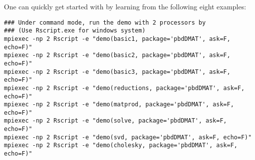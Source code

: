 One can quickly get started with  by learning from the following eight examples:
\begin{lstlisting}[title=Shell Script]
### Under command mode, run the demo with 2 processors by
### (Use Rscript.exe for windows system)
mpiexec -np 2 Rscript -e "demo(basic1, package='pbdDMAT', ask=F, echo=F)"
mpiexec -np 2 Rscript -e "demo(basic2, package='pbdDMAT', ask=F, echo=F)"
mpiexec -np 2 Rscript -e "demo(basic3, package='pbdDMAT', ask=F, echo=F)"
mpiexec -np 2 Rscript -e "demo(reductions, package='pbdDMAT', ask=F, echo=F)"
mpiexec -np 2 Rscript -e "demo(matprod, package='pbdDMAT', ask=F, echo=F)"
mpiexec -np 2 Rscript -e "demo(solve, package='pbdDMAT', ask=F, echo=F)"
mpiexec -np 2 Rscript -e "demo(svd, package='pbdDMAT', ask=F, echo=F)"
mpiexec -np 2 Rscript -e "demo(cholesky, package='pbdDMAT', ask=F, echo=F)"
\end{lstlisting}





